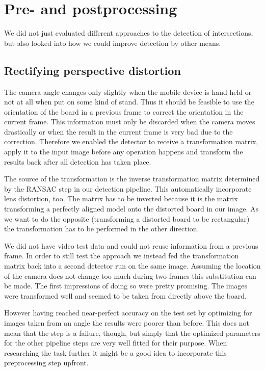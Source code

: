 	\section{Pre- and postprocessing}
	\label{evaluation-prepostprocessing}
	We did not just evaluated different approaches to the detection of intersections, but also looked into how we could improve detection by other means.

	\subsection{Rectifying perspective distortion}
	\label{evaluation-prepostprocessing-perspectiveRectifying}
	The camera angle changes only slightly when the mobile device is hand-held or not at all when put on some kind of stand. Thus it should be feasible to use the orientation of the board in a previous frame to correct the orientation in the current frame. This information must only be discarded when the camera moves drastically or when the result in the current frame is very bad due to the correction. Therefore we enabled the detector to receive a transformation matrix, apply it to the input image before any operation happens and transform the results back after all detection has taken place.

	The source of the transformation is the inverse transformation matrix determined by the RANSAC step in our detection pipeline. This automatically incorporate lens distortion, too. The matrix has to be inverted because it is the matrix transforming a perfectly aligned model onto the distorted board in our image. As we want to do the opposite (transforming a distorted board to be rectangular) the transformation has to be performed in the other direction.

	We did not have video test data and could not reuse information from a previous frame. In order to still test the approach we instead fed the transformation matrix back into a second detector run on the same image. Assuming the location of the camera does not change too much during two frames this substitution can be made. The first impressions of doing so were pretty promising. The images were transformed well and seemed to be taken from directly above the board.

	However having reached near-perfect accuracy on the test set by optimizing for images taken from an angle the results were poorer than before. This does not mean that the step is a failure, though, but simply that the optimized parameters for the other pipeline steps are very well fitted for their purpose. When researching the task further it might be a good idea to incorporate this preprocessing step upfront.

